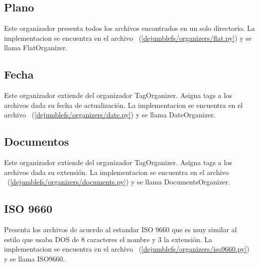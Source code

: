 \subsection{Plano}

Este organizador presenta todos los archivos encontrados en un solo directorio. La implementacion se encuentra en el archivo ~(\ref{dejumblefs/organizers/flat.py}) y se llama FlatOrganizer.

\subsection{Fecha}

Este organizador extiende del organizador TagOrganizer. Asigna tags a los archivos dada su fecha de actualización. La implementacion se encuentra en el archivo ~(\ref{dejumblefs/organizers/date.py}) y se llama DateOrganizer.

\subsection{Documentos}

Este organizador extiende del organizador TagOrganizer. Asigna tags a los archivos dada su extensión. La implementacion se encuentra en el archivo ~(\ref{dejumblefs/organizers/documents.py}) y se llama DocumentsOrganizer.

\subsection{ISO 9660}

Presenta los archivos de acuerdo al estandar ISO 9660 que es muy similar al estilo que usaba DOS de 8 caracteres el nombre y 3 la extensión. La implementacion se encuentra en el archivo ~(\ref{dejumblefs/organizers/iso9660.py}) y se llama ISO9660.


